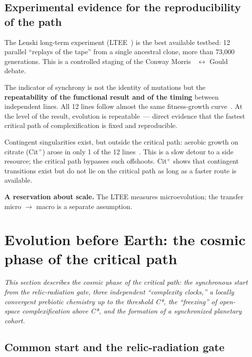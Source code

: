 \documentclass[11pt,a4paper]{article}
\begin{document}
\subsection{Experimental evidence for the reproducibility of the path}
\label{sec:ltee}

The Lenski long-term experiment (LTEE~\cite{Lenski2017}) is the best available testbed: 12 parallel ``replays of the tape'' from a single ancestral clone, more than 73,000 generations. This is a controlled staging of the Conway Morris~\cite{ConwayMorris2003} $\leftrightarrow$ Gould~\cite{Gould1989} debate.

The indicator of synchrony is not the identity of mutations but the \textbf{repeatability of the functional result and of the timing} between independent lines. All 12 lines follow almost the same fitness-growth curve~\cite{Wiser2013,Lenski1994}. At the level of the result, evolution is repeatable~--- direct evidence that the fastest critical path of complexification is fixed and reproducible.

Contingent singularities exist, but outside the critical path: aerobic growth on citrate (Cit$^+$) arose in only 1 of the 12 lines~\cite{Blount2008,Blount2012}. This is a slow detour to a side resource; the critical path bypasses such offshoots. Cit$^+$ shows that contingent transitions exist but do not lie on the critical path as long as a faster route is available.

\textbf{A reservation about scale.} The LTEE measures microevolution; the transfer micro $\to$ macro is a separate assumption.

\section{Evolution before Earth: the cosmic phase of the critical path}
\label{sec:cosmic_ensemble}

\textit{This section describes the cosmic phase of the critical path: the synchronous start from the relic-radiation gate, three independent ``complexity clocks,'' a locally convergent prebiotic chemistry up to the threshold C*, the ``freezing'' of open-space complexification above C*, and the formation of a synchronized planetary cohort.}

\subsection{Common start and the relic-radiation gate}
\label{sec:common_start}
\end{document}
